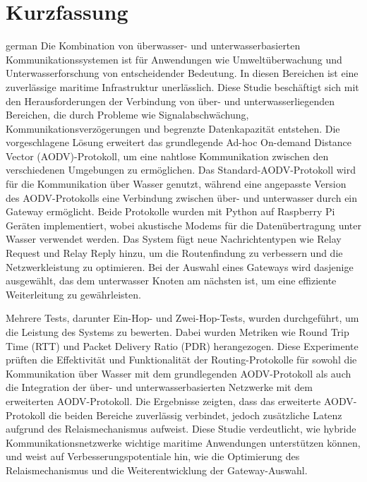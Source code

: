 \documentclass[]{nsm-thesis}
\begin{document}
\chapter*{Kurzfassung}
\begin{otherlanguage*}{german}
Die Kombination von überwasser- und unterwasserbasierten Kommunikationssystemen ist für Anwendungen wie Umweltüberwachung und Unterwasserforschung von entscheidender Bedeutung. In diesen Bereichen ist eine zuverlässige maritime Infrastruktur unerlässlich. Diese Studie beschäftigt sich mit den Herausforderungen der Verbindung von über- und unterwasserliegenden Bereichen, die durch Probleme wie Signalabschwächung, Kommunikationsverzögerungen und begrenzte Datenkapazität entstehen. Die vorgeschlagene Lösung erweitert das grundlegende Ad-hoc On-demand Distance Vector (AODV)-Protokoll, um eine nahtlose Kommunikation zwischen den verschiedenen Umgebungen zu ermöglichen. Das Standard-AODV-Protokoll wird für die Kommunikation über Wasser genutzt, während eine angepasste Version des AODV-Protokolls eine Verbindung zwischen über- und unterwasser durch ein Gateway ermöglicht. Beide Protokolle wurden mit Python auf Raspberry Pi Geräten implementiert, wobei akustische Modems für die Datenübertragung unter Wasser verwendet werden. Das System fügt neue Nachrichtentypen wie Relay Request und Relay Reply hinzu, um die Routenfindung zu verbessern und die Netzwerkleistung zu optimieren. Bei der Auswahl eines Gateways wird dasjenige ausgewählt, das dem unterwasser Knoten am nächsten ist, um eine effiziente Weiterleitung zu gewährleisten.

Mehrere Tests, darunter Ein-Hop- und Zwei-Hop-Tests, wurden durchgeführt, um die Leistung des Systems zu bewerten. Dabei wurden Metriken wie Round Trip Time (RTT) und Packet Delivery Ratio (PDR) herangezogen. Diese Experimente prüften die Effektivität und Funktionalität der Routing-Protokolle für sowohl die Kommunikation über Wasser mit dem grundlegenden AODV-Protokoll als auch die Integration der über- und unterwasserbasierten Netzwerke mit dem erweiterten AODV-Protokoll. Die Ergebnisse zeigten, dass das erweiterte AODV-Protokoll die beiden Bereiche zuverlässig verbindet, jedoch zusätzliche Latenz aufgrund des Relaismechanismus aufweist. Diese Studie verdeutlicht, wie hybride Kommunikationsnetzwerke wichtige maritime Anwendungen unterstützen können, und weist auf Verbesserungspotentiale hin, wie die Optimierung des Relaismechanismus und die Weiterentwicklung der Gateway-Auswahl.

\end{otherlanguage*}
\acresetall
\end{document}
